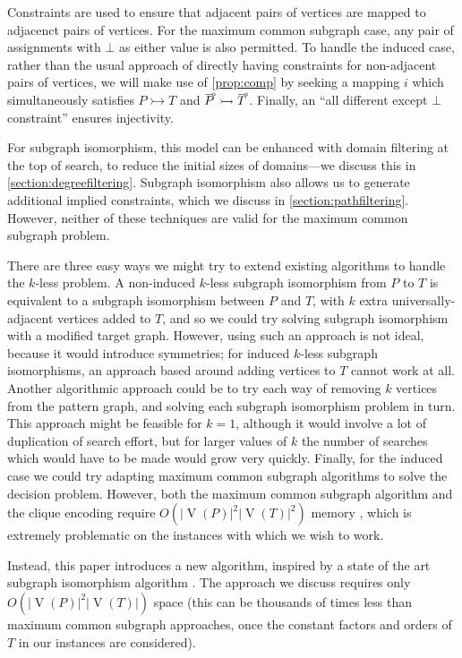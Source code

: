 \documentclass[letterpaper]{article}
\newcommand{\citep}[1]{\cite{#1}}
\theoremstyle{definition}
\newcommand{\V}{\operatorname{V}}
\newcommand{\loopcomp}[1]{\tset{\multimap}{#1}}
\newcommand{\tset}[2]{%
    \tikz[baseline=(X.base),inner sep=0pt,outer sep=0pt]{%
        \node[inner sep=0pt,outer sep=0pt] (X) {$#2$};
        \node[yshift=1.5pt,xshift=1pt] at (X.north) {$\scriptstyle#1$};
}}
\begin{document}
Constraints are used to ensure that adjacent pairs of vertices are mapped to adjacenct pairs of
vertices. For the maximum common subgraph case, any pair of assignments with $\bot$ as either value
is also permitted.  To handle the induced case, rather than the usual approach of directly
having constraints for non-adjacent pairs of vertices, we will make use of \cref{prop:comp} by
seeking a mapping $i$ which simultaneously satisfies $P \rightarrowtail T$ and $\loopcomp{P}
\rightarrowtail \loopcomp{T}$. Finally, an ``all different except $\bot$ constraint'' ensures
injectivity.

For subgraph isomorphism, this model can be enhanced with domain filtering at the top of search, to
reduce the initial sizes of domains---we discuss this in \cref{section:degreefiltering}. Subgraph
isomorphism also allows us to generate additional implied constraints, which we discuss in
\cref{section:pathfiltering}. However, neither of these techniques are valid for the maximum common
subgraph problem.

There are three easy ways we might try to extend existing algorithms to handle the $k$-less problem.
A non-induced $k$-less subgraph isomorphism from $P$ to $T$ is equivalent to a subgraph isomorphism
between $P$ and $T$, with $k$ extra universally-adjacent vertices added to $T$, and so we could try
solving subgraph isomorphism with a modified target graph. However, using such
an approach is not ideal, because it would introduce symmetries; for induced $k$-less subgraph
isomorphisms, an approach based around adding vertices to $T$ cannot work at all.
Another algorithmic approach could be to try each way of removing $k$ vertices from the pattern
graph, and solving each subgraph isomorphism problem in turn. This approach might be feasible for $k
= 1$, although it would involve a lot of duplication of search effort, but for larger values of $k$
the number of searches which would have to be made would grow very quickly.
Finally, for the induced case we could try adapting maximum common subgraph algorithms to solve the
decision problem. However, both the maximum common subgraph algorithm and the clique encoding
require $O(\left|\V(P)\right|^2\left|\V(T)\right|^2)$ memory \citep{DBLP:conf/cp/McCreeshNPS16},
which is extremely problematic on the instances with which we wish to work.

Instead, this paper introduces a new algorithm, inspired by a state of the art subgraph isomorphism
algorithm \citep{DBLP:conf/cp/McCreeshP15}. The approach we discuss requires only
$O(\left|\V(P)\right|^2\left|\V(T)\right|)$ space (this can be thousands of times less than maximum
common subgraph approaches, once the constant factors and orders of $T$ in our instances are
considered).
\end{document}
